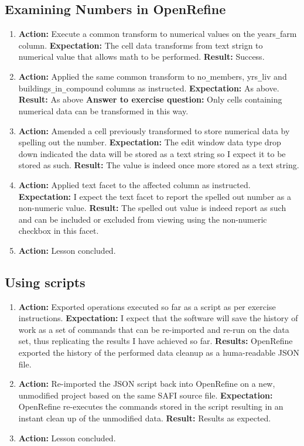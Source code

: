\documentclass{article}
\begin{document}
\subsection{Examining Numbers in OpenRefine}
\begin{enumerate}
    \item  \textbf{Action: }Execute a common transform to numerical values on the years\verb|_|farm column.
    \subitem \textbf{Expectation: }The cell data transforms from text strign to numerical value that allows math to be performed.
    \subitem \textbf{Result: }Success.
    \item \textbf{Action: }Applied the same common transform to no\verb|_|members, yrs\verb|_|liv and buildings\verb|_|in\verb|_|compound columns as instructed.
    \subitem \textbf{Expectation: }As above.
    \subitem \textbf{Result: }As above
    \subitem \textbf{Answer to exercise question: }Only cells containing numerical data can be transformed in this way.
    \item \textbf{Action: }Amended a cell previously transformed to store numerical data by spelling out the number.
    \subitem \textbf{Expectation: }The edit window data type drop down indicated the data will be stored as a text string so I expect it to be stored as such.
    \subitem \textbf{Result: }The value is indeed once more stored as a text string.
    \item \textbf{Action: }Applied text facet to the affected column as instructed.
    \subitem \textbf{Expectation: }I expect the text facet to report the spelled out number as a non-numeric value.
    \subitem \textbf{Result: }The spelled out value is indeed report as such and can be included or excluded from viewing using the non-numeric checkbox in this facet.
    \item \textbf{Action: }Lesson concluded.
\end{enumerate}
    \subsection{Using scripts}
    \begin{enumerate}
        \item \textbf{Action: }Exported operations executed so far as a script as per exercise instructions.
        \subitem \textbf{Expectation: }I expect that the software will save the history of work as a set of commands that can be re-imported and re-run on the data set, thus replicating the results I have achieved so far.
        \subitem \textbf{Results: }OpenRefine exported the history of the performed data cleanup as a huma-readable JSON file.
        \item \textbf{Action: }Re-imported the JSON script back into OpenRefine on a new, unmodified project based on the same SAFI source file.
        \subitem \textbf{Expectation: }OpenRefine re-executes the commands stored in the script resulting in an instant clean up of the unmodified data.
        \subitem \textbf{Result: }Results as expected.
        \item \textbf{Action: }Lesson concluded.
    \end{enumerate}
\end{document}
